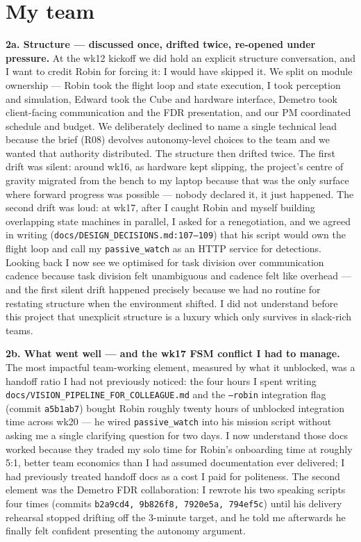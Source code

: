 \section{My team}

\textbf{2a. Structure --- discussed once, drifted twice, re-opened under pressure.}
At the wk12 kickoff we did hold an explicit structure conversation, and I want to credit Robin for forcing it: I would have skipped it. We split on module ownership --- Robin took the flight loop and state execution, I took perception and simulation, Edward took the Cube and hardware interface, Demetro took client-facing communication and the FDR presentation, and our PM coordinated schedule and budget. We deliberately declined to name a single technical lead because the brief (R08) devolves autonomy-level choices to the team and we wanted that authority distributed. The structure then drifted twice. The first drift was silent: around wk16, as hardware kept slipping, the project's centre of gravity migrated from the bench to my laptop because that was the only surface where forward progress was possible --- nobody declared it, it just happened. The second drift was loud: at wk17, after I caught Robin and myself building overlapping state machines in parallel, I asked for a renegotiation, and we agreed in writing (\texttt{docs/DESIGN\_DECISIONS.md:107--109}) that his script would own the flight loop and call my \texttt{passive\_watch} as an HTTP service for detections. Looking back I now see we optimised for task division over communication cadence because task division felt unambiguous and cadence felt like overhead --- and the first silent drift happened precisely because we had no routine for restating structure when the environment shifted. I did not understand before this project that unexplicit structure is a luxury which only survives in slack-rich teams.

\textbf{2b. What went well --- and the wk17 FSM conflict I had to manage.}
The most impactful team-working element, measured by what it unblocked, was a handoff ratio I had not previously noticed: the four hours I spent writing \texttt{docs/VISION\_PIPELINE\_FOR\_COLLEAGUE.md} and the \texttt{--robin} integration flag (commit \texttt{a5b1ab7}) bought Robin roughly twenty hours of unblocked integration time across wk20 --- he wired \texttt{passive\_watch} into his mission script without asking me a single clarifying question for two days. I now understand those docs worked because they traded my solo time for Robin's onboarding time at roughly 5:1, better team economics than I had assumed documentation ever delivered; I had previously treated handoff docs as a cost I paid for politeness. The second element was the Demetro FDR collaboration: I rewrote his two speaking scripts four times (commits \texttt{b2a9cd4, 9b826f8, 7920e5a, 794ef5c}) until his delivery rehearsal stopped drifting off the 3-minute target, and he told me afterwards he finally felt confident presenting the autonomy argument.

